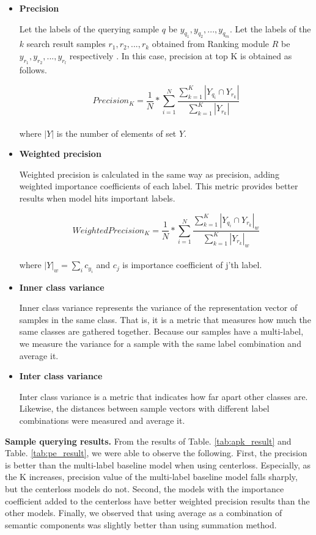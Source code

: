 \begin{itemize}
	\item{ \textbf{Precision} 
	
	Let the labels of the querying sample $q$ be $y_{q_1}, y_{q_2}, ..., y_{q_m}$. Let the labels of the $k$ search result samples $r_1, r_2, ..., r_k$ obtained from Ranking module $R$ be $y_{r_1}, y_{r_2}, ..., y_{r_l}$ respectively . In this case, precision at top K is obtained as follows.

	\[
	Precision_{K} = \frac{1}{N} *\sum_{i=1}^{N}{ \frac{ \sum_{k=1}^{K}{|Y_{q_i} \cap Y_{r_k}|}}{  \sum_{k=1}^{K}{ |Y_{r_k}| }  }}
	\]\\
	where $|Y|$ is the number of elements of set $Y$.
	}
	\item{ \textbf{Weighted precision} 
	
	Weighted precision is calculated in the same way as precision, adding weighted importance coefficients of each label. This metric provides better results when model hits important labels.

	\[
	WeightedPrecision_{K} = \frac{1}{N} *\sum_{i=1}^{N}{ \frac{ \sum_{k=1}^{K}{|Y_{q_i} \cap Y_{r_k}|_w}}{  \sum_{k=1}^{K}{ |Y_{r_k}|_w }  }}
	\]\\
	where $|Y|_w = \sum_i{c_{y_i}}$ and $c_j$ is importance coefficient of j'th label.
	}
	\item{ \textbf{Inner class variance} 
	
	Inner class variance represents the variance of the representation vector of samples in the same class. That is, it is a metric that measures how much the same classes are gathered together. Because our samples have a multi-label, we measure the variance for a sample with the same label combination and average it.
  
	}
	\item{ \textbf{Inter class variance} 
	
	Inter class variance is a metric that indicates how far apart other classes are. Likewise, the distances between sample vectors with different label combinations were measured and average it.
 
	}
\end{itemize}



\textbf{Sample querying results. }
From the results of Table. \ref{tab:apk_result} and Table. \ref{tab:pe_result}, we were able to observe the following. First, the precision is better than the multi-label baseline model when using centerloss. Especially, as the K increases, precision value of the multi-label baseline model falls sharply, but the centerloss models do not. Second, the models with the importance coefficient added to the centerloss have better weighted precision results than the other models. Finally, we observed that using average as a combination of semantic components was slightly better than using summation method.

